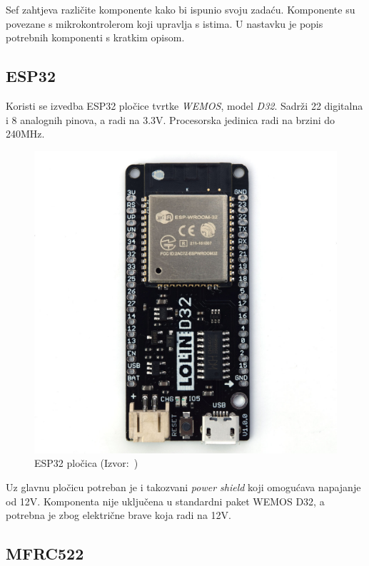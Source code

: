 Sef zahtjeva različite komponente kako bi ispunio svoju zadaću.
Komponente su povezane s mikrokontrolerom koji upravlja s istima.
U nastavku je popis potrebnih komponenti s kratkim opisom.

\subsection{ESP32}

Koristi se izvedba ESP32 pločice tvrtke \textit{WEMOS}, model \textit{D32}.
Sadrži 22 digitalna i 8 analognih pinova, a radi na 3.3V\@.
Procesorska jedinica radi na brzini do 240MHz.

\begin{figure}[h!]
    \centering
    \includegraphics[scale=0.5]{images/d32_lolin}
    \caption{ESP32 pločica (Izvor:~\cite{wemos-docs})}
\end{figure}

Uz glavnu pločicu potreban je i takozvani \textit{power shield} koji omogućava napajanje od 12V\@.
Komponenta nije uključena u standardni paket WEMOS D32, a potrebna je zbog električne brave koja radi na 12V\@.

\subsection{MFRC522}

